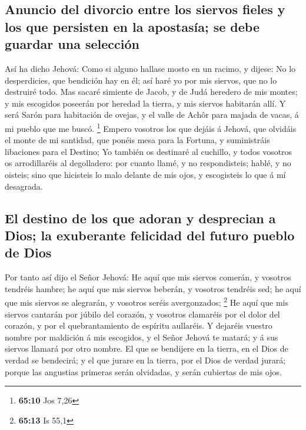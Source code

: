 \hypertarget{anuncio-del-divorcio-entre-los-siervos-fieles-y-los-que-persisten-en-la-apostasuxeda-se-debe-guardar-una-selecciuxf3n}{%
\subsection{Anuncio del divorcio entre los siervos fieles y los que
persisten en la apostasía; se debe guardar una
selección}\label{anuncio-del-divorcio-entre-los-siervos-fieles-y-los-que-persisten-en-la-apostasuxeda-se-debe-guardar-una-selecciuxf3n}}

 Así ha dicho Jehová: Como si alguno hallase mosto en un
racimo, y dijese: No lo desperdicies, que bendición hay en él; así haré
yo por mis siervos, que no lo destruiré todo.  Mas sacaré
simiente de Jacob, y de Judá heredero de mis montes; y mis escogidos
poseerán por heredad la tierra, y mis siervos habitarán allí.
 Y será Sarón para habitación de ovejas, y el valle de
Achôr para majada de vacas, á mi pueblo que me buscó. \footnote{\textbf{65:10}
  Jos 7,26}  Empero vosotros los que dejáis á Jehová, que
olvidáis el monte de mi santidad, que ponéis mesa para la Fortuna, y
suministráis libaciones para el Destino;  Yo también os
destinaré al cuchillo, y todos vosotros os arrodillaréis al degolladero:
por cuanto llamé, y no respondisteis; hablé, y no oisteis; sino que
hicisteis lo malo delante de mis ojos, y escogisteis lo que á mí
desagrada.

\hypertarget{el-destino-de-los-que-adoran-y-desprecian-a-dios-la-exuberante-felicidad-del-futuro-pueblo-de-dios}{%
\subsection{El destino de los que adoran y desprecian a Dios; la
exuberante felicidad del futuro pueblo de
Dios}\label{el-destino-de-los-que-adoran-y-desprecian-a-dios-la-exuberante-felicidad-del-futuro-pueblo-de-dios}}

 Por tanto así dijo el Señor Jehová: He aquí que mis
siervos comerán, y vosotros tendréis hambre; he aquí que mis siervos
beberán, y vosotros tendréis sed; he aquí que mis siervos se alegrarán,
y vosotros seréis avergonzados; \footnote{\textbf{65:13} Is 55,1}
 He aquí que mis siervos cantarán por júbilo del corazón,
y vosotros clamaréis por el dolor del corazón, y por el quebrantamiento
de espíritu aullaréis.  Y dejaréis vuestro nombre por
maldición á mis escogidos, y el Señor Jehová te matará; y á sus siervos
llamará por otro nombre.  El que se bendijere en la
tierra, en el Dios de verdad se bendecirá; y el que jurare en la tierra,
por el Dios de verdad jurará; porque las angustias primeras serán
olvidadas, y serán cubiertas de mis ojos.

